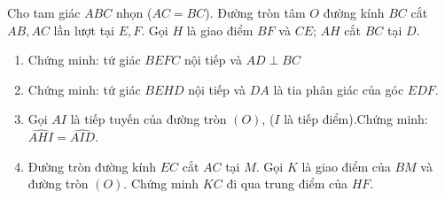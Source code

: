 \begin{ex}%
	Cho tam giác $ABC$ nhọn ($AC=BC$). Đường tròn tâm $O$ đường kính $BC$ cắt $AB, AC$ lần lượt tại $E, F$. Gọi $H$ là giao điểm $BF$ và $CE$; $AH$ cắt $BC$ tại $D$.
    \begin{enumerate}
		\item Chứng minh: tứ giác $BEFC$ nội tiếp và $AD \perp BC$
		\item Chứng minh: tứ giác $BEHD$ nội tiếp và $DA$ là tia phân giác của góc $EDF$.
        \item Gọi $AI$ là tiếp tuyến của đường tròn $(O)$, ($I$ là tiếp điểm).Chứng minh: $\widehat{AHI}=\widehat{AID}$.
        \item Đường tròn đường kính $EC$ cắt $AC$ tại $M$. Gọi $K$ là giao điểm của $BM$ và đường tròn $(O)$. Chứng minh $KC$ đi qua trung điểm của $HF$.
	\end{enumerate}
\end{ex}
